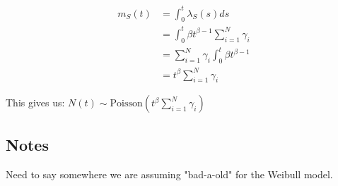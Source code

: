 \documentclass[12pt]{article}
\begin{document}
$$
\begin{aligned}
	m_S(t) &= \int_0^t \lambda_S(s)ds \\
    &= \int_0^t \beta t^{\beta -1} \sum_{i = 1}^N \gamma_i \\
    &= \sum_{i = 1}^N \gamma_i \int_0^t \beta t^{\beta -1} \\
    &= t^\beta \sum_{i = 1}^N \gamma_i
\end{aligned}
$$

This gives us: $N(t) \sim \text{Poisson}(t^\beta \sum_{i = 1}^N \gamma_i)$


\subsection{Notes}
Need to say somewhere we are assuming "bad-a-old" for the Weibull model.
\end{document}
